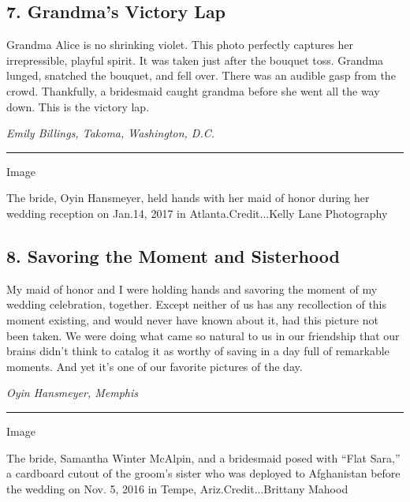 \hypertarget{7-grandmas-victory-lap}{%
\subsection{7. Grandma's Victory Lap}\label{7-grandmas-victory-lap}}

Grandma Alice is no shrinking violet. This photo perfectly captures her
irrepressible, playful spirit. It was taken just after the bouquet toss.
Grandma lunged, snatched the bouquet, and fell over. There was an
audible gasp from the crowd. Thankfully, a bridesmaid caught grandma
before she went all the way down. This is the victory lap.

\emph{Emily Billings, Takoma, Washington, D.C.}

\begin{center}\rule{0.5\linewidth}{\linethickness}\end{center}

Image

The bride, Oyin Hansmeyer, held hands with her maid of honor during her
wedding reception on Jan.14, 2017 in Atlanta.Credit...Kelly Lane
Photography

\hypertarget{8-savoring-the-moment-and-sisterhood}{%
\subsection{8. Savoring the Moment and
Sisterhood}\label{8-savoring-the-moment-and-sisterhood}}

My maid of honor and I were holding hands and savoring the moment of my
wedding celebration, together. Except neither of us has any recollection
of this moment existing, and would never have known about it, had this
picture not been taken. We were doing what came so natural to us in our
friendship that our brains didn't think to catalog it as worthy of
saving in a day full of remarkable moments. And yet it's one of our
favorite pictures of the day.

\emph{Oyin Hansmeyer, Memphis}

\begin{center}\rule{0.5\linewidth}{\linethickness}\end{center}

Image

The bride, Samantha Winter McAlpin, and a bridesmaid posed with ``Flat
Sara,'' a cardboard cutout of the groom's sister who was deployed to
Afghanistan before the wedding on Nov. 5, 2016 in Tempe,
Ariz.Credit...Brittany Mahood

